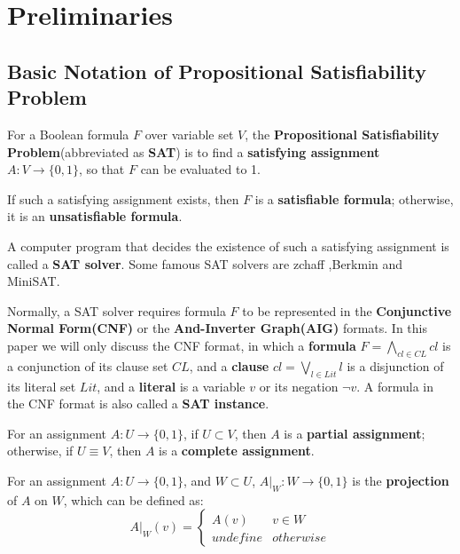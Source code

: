 \documentclass[journal]{IEEEtran}
\begin{document}


\section{Preliminaries}\label{sec_pre}

\subsection{Basic Notation of Propositional Satisfiability Problem}\label{subsec_SAT}
For a Boolean formula $F$ over variable set $V$,
the \textbf{Propositional Satisfiability Problem}(abbreviated as \textbf{SAT}) is to find a \textbf{satisfying assignment} $A:V\to \{0,1\}$,
so that $F$ can be evaluated to 1.

If such a satisfying assignment exists, then $F$ is a \textbf{satisfiable formula};
otherwise,
it is an \textbf{unsatisfiable formula}.

A computer program that decides the existence of such a satisfying assignment is called a \textbf{SAT solver}.
Some famous SAT solvers are zchaff\cite{CHAFF} ,Berkmin\cite{BERKMIN} and MiniSAT\cite{EXTSAT}.

Normally,
a SAT solver requires formula $F$ to be represented in the \textbf{Conjunctive Normal Form(CNF)} or the \textbf{And-Inverter Graph(AIG)} formats.
In this paper we will only discuss the CNF format,
in which a \textbf{formula} $F=\bigwedge_{cl\in CL}cl$ is a conjunction of its clause set $CL$,
and a \textbf{clause} $cl=\bigvee_{l\in Lit}l$ is a disjunction of its literal set $Lit$,
and a \textbf{literal} is a variable $v$ or its negation $\neg v$.
A formula in the CNF format is also called a \textbf{SAT instance}.

For an assignment $A:U\to \{0,1\}$,
if $U\subset V$,
then $A$ is a \textbf{partial assignment};
otherwise,
if $U\equiv V$,
then $A$ is a \textbf{complete assignment}.

For an assignment $A:U\to \{0,1\}$,
and $W\subset U$, $A|_W:W\to \{0,1\}$ is the \textbf{projection} of $A$ on $W$,
which can be defined as:
\begin{displaymath}
A|_W(v)=\left\{ \begin{array}{ll}
A(v) & v\in W \\
undefine & otherwise
\end{array}
\right.
\end{displaymath}
\end{document}
